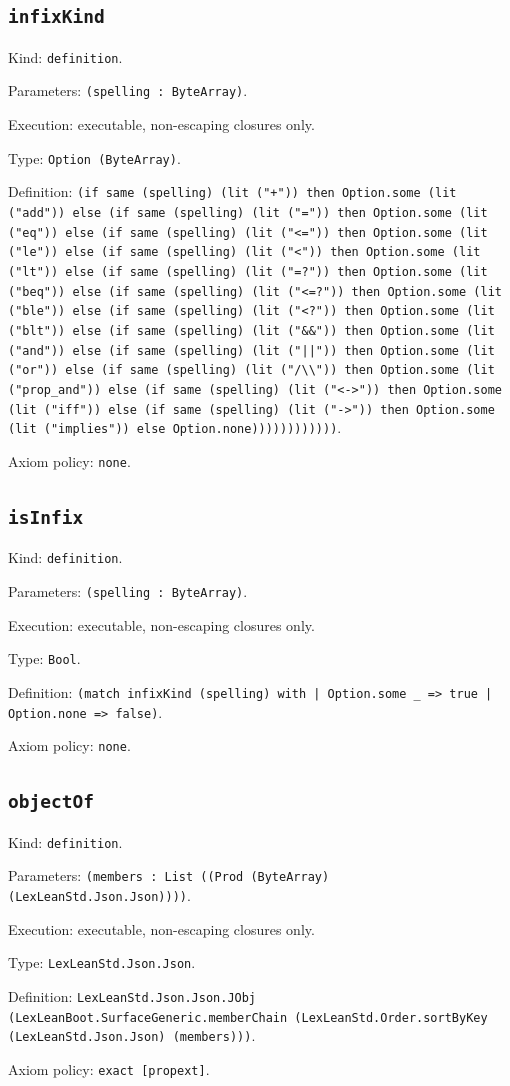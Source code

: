 \documentclass[11pt]{article}
\begin{document}
\subsection*{\texttt{infixKind}}
\noindent Kind: \texttt{definition}.\par
\noindent Parameters: \texttt{(spelling : ByteArray)}.\par
\noindent Execution: executable, non-escaping closures only.\par
\noindent Type: \texttt{Option (ByteArray)}.\par
\noindent Definition: \texttt{(if same (spelling) (lit ("+")) then Option.some (lit ("add")) else (if same (spelling) (lit ("=")) then Option.some (lit ("eq")) else (if same (spelling) (lit ("<=")) then Option.some (lit ("le")) else (if same (spelling) (lit ("<")) then Option.some (lit ("lt")) else (if same (spelling) (lit ("=?")) then Option.some (lit ("beq")) else (if same (spelling) (lit ("<=?")) then Option.some (lit ("ble")) else (if same (spelling) (lit ("<?")) then Option.some (lit ("blt")) else (if same (spelling) (lit ("\&\&")) then Option.some (lit ("and")) else (if same (spelling) (lit ("||")) then Option.some (lit ("or")) else (if same (spelling) (lit ("/\textbackslash{}\textbackslash{}")) then Option.some (lit ("prop\_and")) else (if same (spelling) (lit ("<->")) then Option.some (lit ("iff")) else (if same (spelling) (lit ("->")) then Option.some (lit ("implies")) else Option.none))))))))))))}.\par
\noindent Axiom policy: \texttt{none}.\par
\subsection*{\texttt{isInfix}}
\noindent Kind: \texttt{definition}.\par
\noindent Parameters: \texttt{(spelling : ByteArray)}.\par
\noindent Execution: executable, non-escaping closures only.\par
\noindent Type: \texttt{Bool}.\par
\noindent Definition: \texttt{(match infixKind (spelling) with | Option.some \_ => true | Option.none => false)}.\par
\noindent Axiom policy: \texttt{none}.\par
\subsection*{\texttt{objectOf}}
\noindent Kind: \texttt{definition}.\par
\noindent Parameters: \texttt{(members : List ((Prod (ByteArray) (LexLeanStd.Json.Json))))}.\par
\noindent Execution: executable, non-escaping closures only.\par
\noindent Type: \texttt{LexLeanStd.Json.Json}.\par
\noindent Definition: \texttt{LexLeanStd.Json.Json.JObj (LexLeanBoot.SurfaceGeneric.memberChain (LexLeanStd.Order.sortByKey (LexLeanStd.Json.Json) (members)))}.\par
\noindent Axiom policy: \texttt{exact [propext]}.\par
\end{document}
